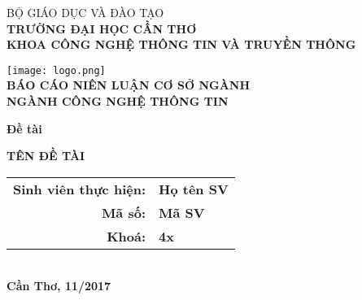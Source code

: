 \documentclass[../thesis.tex]{subfiles}
\begin{document}
\begin{titlepage}

\begin{center}

BỘ GIÁO DỤC VÀ ĐÀO TẠO\\
\textbf{TRƯỜNG ĐẠI HỌC CẦN THƠ\\}
\textbf{KHOA CÔNG NGHỆ THÔNG TIN VÀ TRUYỀN THÔNG\\[1cm]}

\texttt{[image: logo.png]}\\[1cm]

\textbf{BÁO CÁO NIÊN LUẬN CƠ SỞ NGÀNH\\}
\textbf{NGÀNH CÔNG NGHỆ THÔNG TIN\\[2cm]}

\begin{large}
\textbf{Đề tài\\[0.5cm]}
\end{large}
\textbf{{\LARGE TÊN ĐỀ TÀI}}
\\[4cm]

\begin{tabular}{ r l }
\textbf{Sinh viên thực hiện:} & \textbf{Họ tên SV}\\ 
\textbf{Mã số:} & \textbf{Mã SV}\\  
\textbf{Khoá:} & \textbf{4x}   
\end{tabular}
\\[4cm]

\textbf{Cần Thơ, 11/2017}

\end{center}

\end{titlepage}
\end{document}
